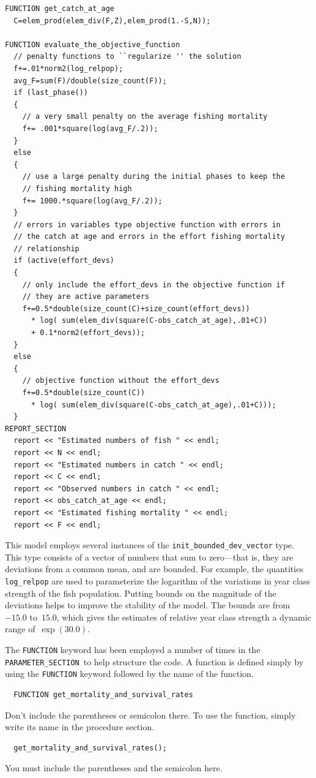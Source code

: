 \documentclass{admbmanual}
\newcommand\PS{\texttt{PARAMETER\_SECTION}}
\begin{document}
\begin{lstlisting}
FUNCTION get_catch_at_age
  C=elem_prod(elem_div(F,Z),elem_prod(1.-S,N));

FUNCTION evaluate_the_objective_function
  // penalty functions to ``regularize '' the solution
  f+=.01*norm2(log_relpop);
  avg_F=sum(F)/double(size_count(F));
  if (last_phase())
  {
    // a very small penalty on the average fishing mortality
    f+= .001*square(log(avg_F/.2));
  }
  else
  {
    // use a large penalty during the initial phases to keep the
    // fishing mortality high
    f+= 1000.*square(log(avg_F/.2));
  }
  // errors in variables type objective function with errors in
  // the catch at age and errors in the effort fishing mortality
  // relationship
  if (active(effort_devs)
  {
    // only include the effort_devs in the objective function if
    // they are active parameters
    f+=0.5*double(size_count(C)+size_count(effort_devs))
      * log( sum(elem_div(square(C-obs_catch_at_age),.01+C))
      + 0.1*norm2(effort_devs));
  }
  else
  {
    // objective function without the effort_devs
    f+=0.5*double(size_count(C))
      * log( sum(elem_div(square(C-obs_catch_at_age),.01+C)));
  }
REPORT_SECTION
  report << "Estimated numbers of fish " << endl;
  report << N << endl;
  report << "Estimated numbers in catch " << endl;
  report << C << endl;
  report << "Observed numbers in catch " << endl;
  report << obs_catch_at_age << endl;
  report << "Estimated fishing mortality " << endl;
  report << F << endl;
\end{lstlisting}
This model employs several instances of the \texttt{init\_bounded\_dev\_vector}
type. This type consists of a vector of numbers that sum to zero---that is, they
are deviations from a common mean, and are bounded. For example, the quantities
\texttt{log\_relpop} are used to parameterize the logarithm of the variations in
year class strength of the fish population. Putting bounds on the magnitude of
the deviations helps to improve the stability of the model. The bounds are
from~$-15.0$ to~$15.0$, which gives the estimates of relative year class
strength a dynamic range of~$\exp(30.0)$.

The \texttt{FUNCTION} keyword has been employed a number of times in the \PS\ to
help structure the code. A function is defined simply by using the
\texttt{FUNCTION} keyword followed by the name of the function.
\begin{lstlisting}
  FUNCTION get_mortality_and_survival_rates
\end{lstlisting}
Don't include the parentheses or semicolon there. To use the function, simply
write its name in the procedure section.
\begin{lstlisting}
  get_mortality_and_survival_rates();
\end{lstlisting}
You must include the parentheses and the semicolon here.
\end{document}
